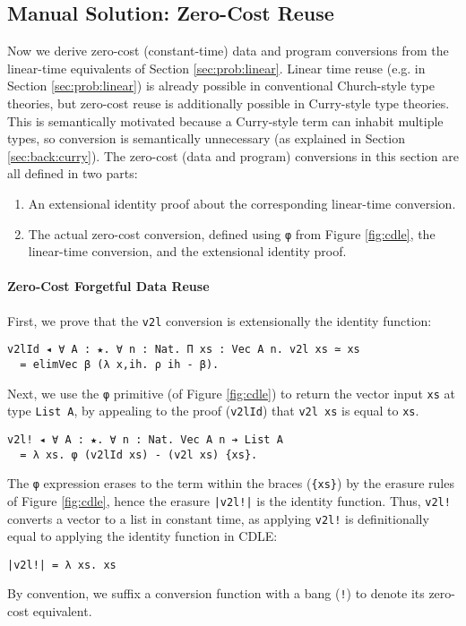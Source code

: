 \documentclass[acmsmall,screen]{acmart}
\newcommand{\refsec}[1]{Section \ref{sec:#1}}
\newcommand{\labsec}[1]{\label{sec:#1}}
\newcommand{\reffig}[1]{Figure \ref{fig:#1}}
\begin{document}
\subsection{Manual Solution: Zero-Cost Reuse}
\labsec{prob:manual}

Now we derive zero-cost (constant-time) data and program conversions
from the linear-time equivalents of \refsec{prob:linear}.
Linear time reuse
(e.g. in \refsec{prob:linear}) is already possible in conventional
Church-style type theories, but zero-cost reuse is additionally
possible in Curry-style type theories. This is semantically motivated
because a Curry-style term can inhabit multiple types,
so conversion is semantically unnecessary
(as explained in \refsec{back:curry}).
The zero-cost (data and program) conversions in this section
are all defined in two parts:
\begin{enumerate}
\item An extensional identity proof about the corresponding linear-time conversion.
\item The actual zero-cost conversion, defined using \verb;φ; from
  \reffig{cdle}, the linear-time conversion, and the extensional
  identity proof.
\end{enumerate}

\paragraph{Zero-Cost Forgetful Data Reuse}

First, we prove that the \verb;v2l; conversion is extensionally the
identity function:
\begin{verbatim}
v2lId ◂ ∀ A : ★. ∀ n : Nat. Π xs : Vec A n. v2l xs ≃ xs 
  = elimVec β (λ x,ih. ρ ih - β).
\end{verbatim}
Next, we use the \verb;φ; primitive (of \reffig{cdle}) to return the
vector input \verb;xs; at type \verb;List A;, by appealing to the
proof (\verb;v2lId;) that \verb;v2l xs; is equal to \verb;xs;.
\begin{verbatim}
v2l! ◂ ∀ A : ★. ∀ n : Nat. Vec A n ➔ List A
  = λ xs. φ (v2lId xs) - (v2l xs) {xs}.
\end{verbatim}
The \verb;φ; expression erases to the term within the braces
(\verb;{xs};) by the erasure rules of \reffig{cdle}, hence
the erasure \verb;|v2l!|; is the identity function.
Thus, \verb;v2l!; converts a vector to a list in
constant time, as applying \verb;v2l!; is definitionally equal to
applying the identity function in CDLE:
\begin{verbatim}
|v2l!| = λ xs. xs
\end{verbatim}
By convention, we suffix a
conversion function with a bang (\verb;!;) to denote its zero-cost
equivalent.
\end{document}
